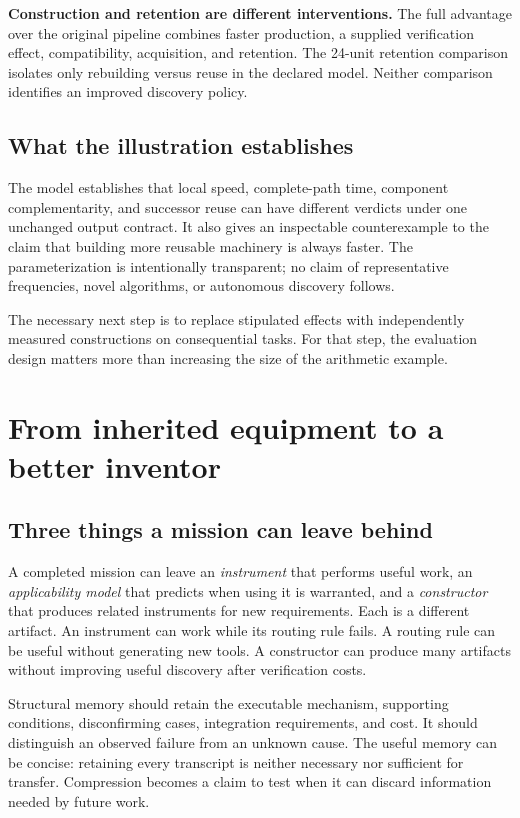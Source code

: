 \documentclass[11pt,letterpaper]{article}
\theoremstyle{remark}\newtheorem{remark}{Remark}[section]
\begin{document}
\textbf{Construction and retention are different interventions.}
The full advantage over the original pipeline combines faster production, a supplied verification effect, compatibility, acquisition, and retention.
The 24-unit retention comparison isolates only rebuilding versus reuse in the declared model.
Neither comparison identifies an improved discovery policy.

\subsection{What the illustration establishes}
The model establishes that local speed, complete-path time, component complementarity, and successor reuse can have different verdicts under one unchanged output contract.
It also gives an inspectable counterexample to the claim that building more reusable machinery is always faster.
The parameterization is intentionally transparent; no claim of representative frequencies, novel algorithms, or autonomous discovery follows.

The necessary next step is to replace stipulated effects with independently measured constructions on consequential tasks.
For that step, the evaluation design matters more than increasing the size of the arithmetic example.

\section{From inherited equipment to a better inventor}\label{sec:inheritance}

\subsection{Three things a mission can leave behind}
A completed mission can leave an \emph{instrument} that performs useful work, an \emph{applicability model} that predicts when using it is warranted, and a \emph{constructor} that produces related instruments for new requirements.
Each is a different artifact.
An instrument can work while its routing rule fails.
A routing rule can be useful without generating new tools.
A constructor can produce many artifacts without improving useful discovery after verification costs.

Structural memory should retain the executable mechanism, supporting conditions, disconfirming cases, integration requirements, and cost.
It should distinguish an observed failure from an unknown cause.
The useful memory can be concise: retaining every transcript is neither necessary nor sufficient for transfer.
Compression becomes a claim to test when it can discard information needed by future work.
\end{document}
